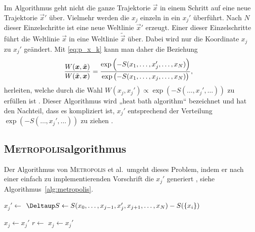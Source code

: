 Im Algorithmus geht nicht die ganze Trajektorie $\vec x$ in einem Schritt auf
eine neue Trajektorie $\vec x'$ über. Vielmehr werden die $x_j$ einzeln in ein
$x_j'$ überführt. Nach $N$ dieser Einzelschritte ist eine neue Weltlinie $\vec
x'$ erzeugt. Einer dieser Einzelschritte führt die Weltlinie $\vec x$ in eine
Weltlinie $\tilde{\vec x}$ über. Dabei wird nur die Koordinate $x_j$ zu $x_j'$
geändert. Mit \eqref{eq:p_x_k} kann man daher die Beziehung
\parencite[(3.25)]{Creutz/Statistical_Approach_QM}
\[
    \frac{W(\vec x, \tilde{\vec x})}{W(\tilde{\vec x}, \vec x)}
    = \frac{\exp\del{-S(x_1, \ldots, x_j', \ldots, x_N)}}{\exp\del{-S(x_1, \ldots, x_j,
    \ldots, x_N)}},
\]
herleiten, welche durch die Wahl $W(x_j, x_j') \propto \exp(-S(\ldots, x_j',
\ldots))$ zu erfüllen ist \parencite[(3.27)]{Creutz/Statistical_Approach_QM}.
Dieser Algorithmus wird „heat bath algorithm“ bezeichnet und hat den Nachteil,
dass es kompliziert ist, $x_j'$ entsprechend der Verteilung $\exp(-S(\ldots,
x_j', \ldots))$ zu ziehen \parencite[438]{Creutz/Statistical_Approach_QM}.

\subsection{\textsc{Metropolis}algorithmus}

Der Algorithmus von \textsc{Metropolis} et al.\ umgeht dieses Problem, indem er
nach einer einfach zu implementierenden Vorschrift die $x_j'$ generiert
\parencite[439]{Creutz/Statistical_Approach_QM}, siehe
Algorithmus~\ref{alg:metropolis}.

\begin{algorithm}
    \begin{algorithmic}
            \State $x_j' \gets$ 
            \State $\Deltaup S \gets S(x_0, \ldots, x_{j-1}, x_j',
            x_{j+1}, \ldots, x_\timesites) - S(\{x_i\})$

                \State $x_j \gets x_j'$
            \Else
                \State $r \gets$ 
                    \State $x_j \gets x_j'$
                \EndIf
            \EndIf
        \EndFor
    \end{algorithmic}
    \caption{%
        \textsc{Metropolis}algorithmus. Die Funktion $\textsc{Zufallszahl}(a,
        b)$ erzeugt eine Zufallszahl im Intervall $(a, b)$.
    }
    \label{alg:metropolis}
\end{algorithm}

